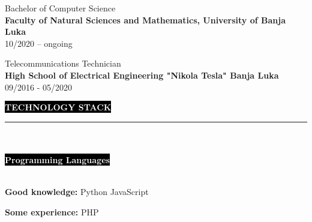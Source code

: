 \documentclass[9pt]{developercv} %
\begin{document}
    {\huge Bachelor of Computer Science \smallskip}\\
    {\textbf{Faculty of Natural Sciences and Mathematics, University of Banja Luka}}\\
    {\faCalendarCheckO \space}{10/2020 -- ongoing}\\
    
    \vspace{0.3cm}
    
	{\huge Telecommunications Technician \smallskip}\\
    {\textbf{High School of Electrical Engineering "Nikola Tesla" Banja Luka}}\\
    {\faCalendarCheckO \space}{09/2016 - 05/2020}\\

\vspace{0.8cm}




\colorbox{black}{{\textcolor{white}{\textbf{\MakeUppercase{Technology stack}}}}}
\par\noindent\rule{\textwidth}{2px}\\\\
\colorbox{black}{{\textcolor{white}{\textbf{Programming Languages}}}}\smallskip\\\\
\begin{minipage}[t]{0.5\textwidth}
	\vspace{-\baselineskip}
	
	\textbf{Good knowledge:} \hspace{10} {Python} \hspace{10} {JavaScript}\smallskip
\end{minipage}
\hfill
\begin{minipage}[t]{0.5\textwidth}
	\vspace{-\baselineskip}
	
	\textbf{Some experience:}  \hspace{10} {PHP}
\end{minipage}

\vspace{0.8cm}
\end{document}
